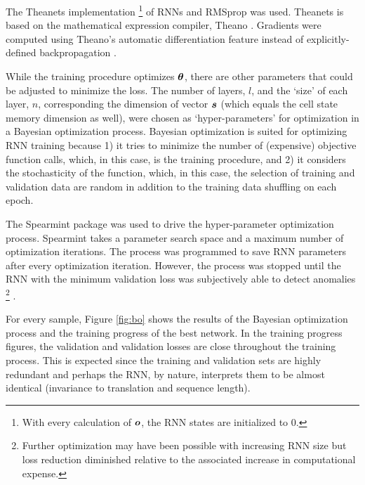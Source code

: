 
The \textsf{Theanets} \cite{Johnson2015} implementation%
\footnote{With every calculation of $\boldsymbol{o}$, the RNN states are initialized to 0.}
of RNNs and RMSprop was used.
%
\textsf{Theanets} is based on the mathematical expression compiler, \textsf{Theano} \cite{Bergstra2010}.
%
Gradients were computed using \textsf{Theano}'s automatic differentiation feature instead of explicitly-defined backpropagation \cite{Rumelhart1986}.


While the training procedure optimizes $\boldsymbol{\theta}$, there are other parameters that could be adjusted to minimize the loss.
%
The number of layers, $l$, and the `size' of each layer, $n$, corresponding the dimension of vector $\boldsymbol{s}$ (which equals the cell state memory dimension as well), were chosen as `hyper-parameters' for optimization in a Bayesian optimization process.
%
Bayesian optimization is suited for optimizing RNN training because
1) it tries to minimize the number of (expensive) objective function calls, which, in this case, is the training procedure, and
2) it considers the stochasticity of the function, which, in this case, the selection of training and validation data are random in addition to the training data shuffling on each epoch.


The \textsf{Spearmint} \cite{snoek2012practical} package was used to drive the hyper-parameter optimization process.
%
\textsf{Spearmint} takes a parameter search space and a maximum number of optimization iterations.
%
The process was programmed to save RNN parameters after every optimization iteration.
%
However, the process was stopped until the RNN with the minimum validation loss was subjectively able to detect anomalies%
%
\footnote{
Further optimization may have been possible with increasing RNN size but loss reduction diminished relative to the associated increase in computational expense.
}%
%
.


For every sample, Figure \ref{fig:bo} shows the results of the Bayesian optimization process and the training progress of the best network.
%
In the training progress figures, the validation and validation losses are close throughout the training process.
%
This is expected since the training and validation sets are highly redundant and perhaps the RNN, by nature, interprets them to be almost identical (invariance to translation and sequence length).

